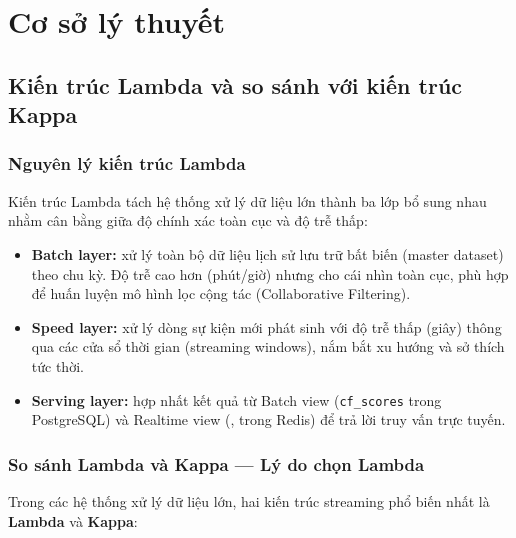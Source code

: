 \chapter{Cơ sở lý thuyết}

\section{Kiến trúc Lambda và so sánh với kiến trúc Kappa}

\subsection{Nguyên lý kiến trúc Lambda}

Kiến trúc Lambda tách hệ thống xử lý dữ liệu lớn thành ba lớp bổ sung nhau nhằm cân bằng giữa độ chính xác toàn cục và độ trễ thấp:

\begin{itemize}
  \item \textbf{Batch layer:} xử lý toàn bộ dữ liệu lịch sử lưu trữ bất biến (master dataset) theo chu kỳ. Độ trễ cao hơn (phút/giờ) nhưng cho cái nhìn toàn cục, phù hợp để huấn luyện mô hình lọc cộng tác (Collaborative Filtering).
  \item \textbf{Speed layer:} xử lý dòng sự kiện mới phát sinh với độ trễ thấp (giây) thông qua các cửa sổ thời gian (streaming windows), nắm bắt xu hướng và sở thích tức thời.
  \item \textbf{Serving layer:} hợp nhất kết quả từ Batch view (\texttt{cf\_scores} trong PostgreSQL) và Realtime view (,  trong Redis) để trả lời truy vấn trực tuyến.
\end{itemize}

\subsection{So sánh Lambda và Kappa --- Lý do chọn Lambda}

Trong các hệ thống xử lý dữ liệu lớn, hai kiến trúc streaming phổ biến nhất là \textbf{Lambda} và \textbf{Kappa}:

